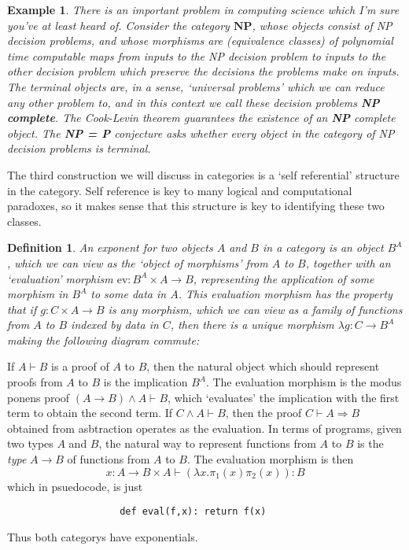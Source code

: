 \documentclass{article}
\theoremstyle{plain}
\newtheorem{definition}{Definition}
\newtheorem*{example}{Example}
\begin{document}
\begin{example}
    There is an important problem in computing science which I'm sure you've at least heard of. Consider the category $\mathbf{NP}$, whose objects consist of NP decision problems, and whose morphisms are (equivalence classes) of polynomial time computable maps from inputs to the NP decision problem to inputs to the other decision problem which preserve the decisions the problems make on inputs. The terminal objects are, in a sense, `universal problems' which we can reduce any other problem to, and in this context we call these decision problems {\bf NP complete}. The Cook-Levin theorem guarantees the existence of an {\bf NP} complete object. The {\bf NP = P} conjecture asks whether every object in the category of NP decision problems is terminal.
\end{example}

The third construction we will discuss in categories is a `self referential' structure in the category. Self reference is key to many logical and computational paradoxes, so it makes sense that this structure is key to identifying these two classes.

\begin{definition}
    An exponent for two objects $A$ and $B$ in a category is an object $B^A$, which we can view as the `object of morphisms' from $A$ to $B$, together with an `evaluation' morphism $\text{ev}: B^A \times A \to B$, representing the application of some morphism in $B^A$ to some data in $A$. This evaluation morphism has the property that if $g: C \times A \to B$ is any morphism, which we can view as a family of functions from $A$ to $B$ indexed by data in $C$, then there is a unique morphism $\lambda g: C \to B^A$ making the following diagram commute:
    \begin{center}
    \end{center}
\end{definition}

If $A \vdash B$ is a proof of $A$ to $B$, then the natural object which should represent proofs from $A$ to $B$ is the implication $B^A$. The evaluation morphism is the modus ponens proof $(A \rightarrow B) \wedge A \vdash B$, which `evaluates' the implication with the first term to obtain the second term. If $C \wedge A \vdash B$, then the proof $C \vdash A \Rightarrow B$ obtained from asbtraction operates as the evaluation. In terms of programs, given two types $A$ and $B$, the natural way to represent functions from $A$ to $B$ is the {\it type} $A \to B$ of functions from $A$ to $B$. The evaluation morphism is then
%
\[ x: A \to B \times A \vdash (\lambda x. \pi_1(x)\pi_2(x)) : B \]
%
which in psuedocode, is just
%
\begin{verbatim}
                    def eval(f,x): return f(x)
\end{verbatim}
%
Thus both categorys have exponentials.
\end{document}

